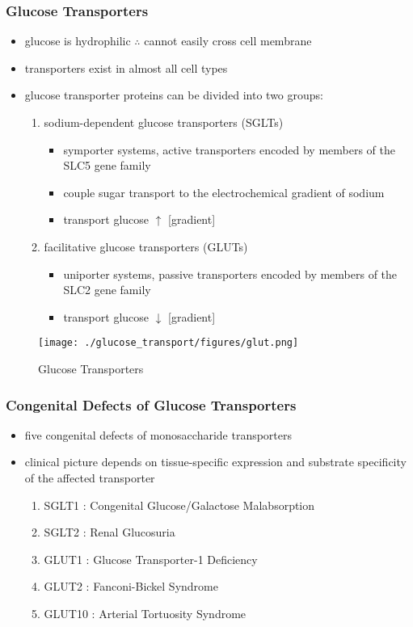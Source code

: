 \documentclass{scrartcl}
\begin{document}
\subsubsection{Glucose Transporters}
\label{sec:org9b4325b}
\begin{itemize}
\item glucose is hydrophilic \(\therefore\) cannot easily cross cell membrane
\item transporters exist in almost all cell types
\item glucose transporter proteins can be divided into two groups:
\begin{enumerate}
\item sodium-dependent glucose transporters (SGLTs)
\begin{itemize}
\item symporter systems, active transporters encoded by members of
the SLC5 gene family
\item couple sugar transport to the electrochemical gradient of sodium
\item transport glucose \(\uparrow\) [gradient]
\end{itemize}
\item facilitative glucose transporters (GLUTs)
\begin{itemize}
\item uniporter systems, passive transporters encoded by members of the SLC2 gene family
\item transport glucose \(\downarrow\) [gradient]
\end{itemize}
\end{enumerate}
\end{itemize}

\begin{figure}[htbp]
\centering
\texttt{[image: ./glucose\_transport/figures/glut.png]}
\caption[glucose transporters]{\label{fig:orgac6e0fa}
Glucose Transporters}
\end{figure}

\subsubsection{Congenital Defects of Glucose Transporters}
\label{sec:org1c3289b}
\begin{itemize}
\item five congenital defects of monosaccharide transporters
\item clinical picture depends on tissue-specific expression and
substrate specificity of the affected transporter

\begin{enumerate}
\item SGLT1 : Congenital Glucose/Galactose Malabsorption
\item SGLT2 : Renal Glucosuria
\item GLUT1 : Glucose Transporter-1 Deficiency
\item GLUT2 : Fanconi-Bickel Syndrome
\item GLUT10 : Arterial Tortuosity Syndrome
\end{enumerate}
\end{itemize}
\end{document}
